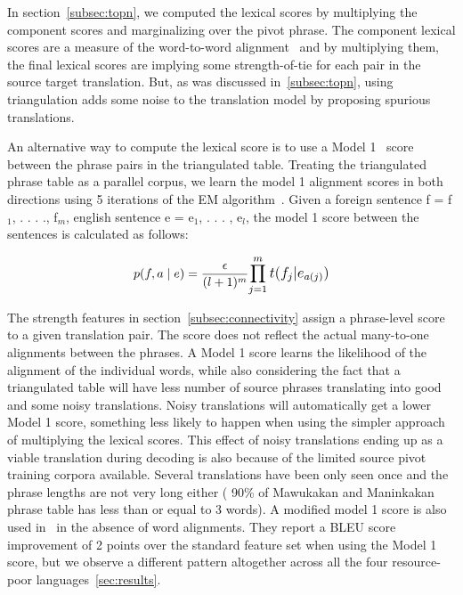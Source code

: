         In section~\ref{subsec:topn}, we computed the lexical scores by multiplying the component scores and marginalizing over the pivot phrase. The component lexical scores are a measure of the word-to-word alignment~\cite{Koehn:03} and by multiplying them, the final lexical scores are implying some strength-of-tie for each pair in the source target translation. But, as was discussed in~\ref{subsec:topn}, using triangulation adds some noise to the translation model by proposing spurious translations.

        An alternative way to compute the lexical score is to use a Model 1~\cite{Brown:1993} score between the phrase pairs in the triangulated table. Treating the triangulated phrase table as a parallel corpus, we learn the model 1 alignment scores in both directions using 5 iterations of the EM algorithm~\cite{Dempster:77}. Given a foreign sentence f = f$_{1}$, . . . ., f$_{m}$, english sentence e = e$_{1}$, . . . , e$_{l}$, the model 1 score between the sentences is calculated as follows:

                \begin{equation}
                        p(f, a \mid e) = \frac{\epsilon}{(l+1)^m}\mathlarger{\prod\limits_{j=1}^{m}t(f_{j}|e_{a(j)})}
                \end{equation}

        The strength features in section~\ref{subsec:connectivity} assign a phrase-level score to a given translation pair. The score does not reflect the actual many-to-one alignments between the phrases. A Model 1 score learns the likelihood of the alignment of the individual words, while also considering the fact that a triangulated table will have less number of source phrases translating into good and some noisy translations. Noisy translations will automatically get a lower Model 1 score, something less likely to happen when using the simpler approach of multiplying the lexical scores. This effect of noisy translations ending up as a viable translation during decoding is also because of the limited source pivot training corpora available. Several translations have been only seen once and the phrase lengths are not very long either ( 90\% of Mawukakan and Maninkakan phrase table has less than or equal to 3 words). A modified model 1 score is also used in~\cite{Cohn:07} in the absence of word alignments. They report a BLEU score improvement of 2 points over the standard feature set when using the Model 1 score, but we observe a different pattern altogether across all the four resource-poor languages~\ref{sec:results}.

